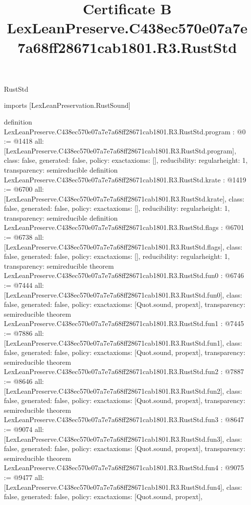 \begin{lexlean}{RustStd}
\title{Certificate B LexLeanPreserve.C438ec570e07a7e7a68ff28671cab1801.R3.RustStd}
\begin{coremodule}
imports [LexLeanPreservation.RustSound]

definition LexLeanPreserve.C438ec570e07a7e7a68ff28671cab1801.R3.RustStd.program : @0 := @1418 {
  all: [LexLeanPreserve.C438ec570e07a7e7a68ff28671cab1801.R3.RustStd.program],
  class: false,
  generated: false,
  policy: exact{axioms: []},
  reducibility: regular{height: 1},
  transparency: semireducible
}
definition LexLeanPreserve.C438ec570e07a7e7a68ff28671cab1801.R3.RustStd.krate : @1419 := @6700 {
  all: [LexLeanPreserve.C438ec570e07a7e7a68ff28671cab1801.R3.RustStd.krate],
  class: false,
  generated: false,
  policy: exact{axioms: []},
  reducibility: regular{height: 1},
  transparency: semireducible
}
definition LexLeanPreserve.C438ec570e07a7e7a68ff28671cab1801.R3.RustStd.flags : @6701 := @6738 {
  all: [LexLeanPreserve.C438ec570e07a7e7a68ff28671cab1801.R3.RustStd.flags],
  class: false,
  generated: false,
  policy: exact{axioms: []},
  reducibility: regular{height: 1},
  transparency: semireducible
}
theorem LexLeanPreserve.C438ec570e07a7e7a68ff28671cab1801.R3.RustStd.fun0 : @6746 := @7444 {
  all: [LexLeanPreserve.C438ec570e07a7e7a68ff28671cab1801.R3.RustStd.fun0],
  class: false,
  generated: false,
  policy: exact{axioms: [Quot.sound, propext]},
  transparency: semireducible
}
theorem LexLeanPreserve.C438ec570e07a7e7a68ff28671cab1801.R3.RustStd.fun1 : @7445 := @7886 {
  all: [LexLeanPreserve.C438ec570e07a7e7a68ff28671cab1801.R3.RustStd.fun1],
  class: false,
  generated: false,
  policy: exact{axioms: [Quot.sound, propext]},
  transparency: semireducible
}
theorem LexLeanPreserve.C438ec570e07a7e7a68ff28671cab1801.R3.RustStd.fun2 : @7887 := @8646 {
  all: [LexLeanPreserve.C438ec570e07a7e7a68ff28671cab1801.R3.RustStd.fun2],
  class: false,
  generated: false,
  policy: exact{axioms: [Quot.sound, propext]},
  transparency: semireducible
}
theorem LexLeanPreserve.C438ec570e07a7e7a68ff28671cab1801.R3.RustStd.fun3 : @8647 := @9074 {
  all: [LexLeanPreserve.C438ec570e07a7e7a68ff28671cab1801.R3.RustStd.fun3],
  class: false,
  generated: false,
  policy: exact{axioms: [Quot.sound, propext]},
  transparency: semireducible
}
theorem LexLeanPreserve.C438ec570e07a7e7a68ff28671cab1801.R3.RustStd.fun4 : @9075 := @9477 {
  all: [LexLeanPreserve.C438ec570e07a7e7a68ff28671cab1801.R3.RustStd.fun4],
  class: false,
  generated: false,
  policy: exact{axioms: [Quot.sound, propext]},
}
\end{coremodule}
\end{lexlean}
